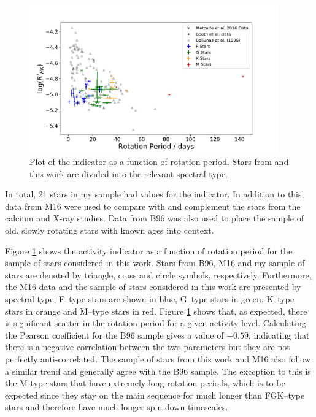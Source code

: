 \begin{figure}
    \centering
    \includegraphics[width=0.95\textwidth]{Figures/5-Activity_rotation/Rhk_v_prot.pdf}
    \caption[\Rprime indicator as a function of rotation period]{Plot of the \Rprime indicator as a function of rotation period. Stars from \citet{Metcalfe_etal_2016} and this work are divided into the relevant spectral type.}
    \label{fig:rhk_v_rot}
\end{figure}

In total, 21 stars in my sample had values for the \Rprime indicator. In addition to this, data from M16 were used to compare with and complement the stars from the calcium and X-ray studies. Data from B96 was also used to place the sample of old, slowly rotating stars with known ages into context.

Figure \ref{fig:rhk_v_rot} shows the \Rprime activity indicator as a function of rotation period for the sample of stars considered in this work. Stars from B96, M16 and my sample of stars are denoted by triangle, cross and circle symbols, respectively. Furthermore, the M16 data and the sample of stars considered in this work are presented by spectral type; F--type stars are shown in blue, G--type stars in green, K--type stars in orange and M--type stars in red. Figure \ref{fig:rhk_v_rot} shows that, as expected, there is significant scatter in the rotation period for a given activity level. Calculating the Pearson coefficient for the B96 sample gives a value of $-0.59$, indicating that there is a negative correlation between the two parameters but they are not perfectly anti-correlated. The sample of stars from this work and M16 also follow a similar trend and generally agree with the B96 sample. The exception to this is the M-type stars that have extremely long rotation periods, which is to be expected since they stay on the main sequence for much longer than FGK--type stars and therefore have much longer spin-down timescales.

